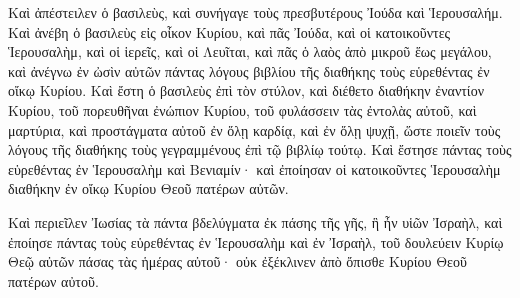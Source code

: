 {\par }{\PP {}Καὶ ἀπέστειλεν ὁ βασιλεὺς, καὶ συνήγαγε τοὺς πρεσβυτέρους Ἰούδα καὶ Ἱερουσαλήμ.
Καὶ ἀνέβη ὁ βασιλεὺς εἰς οἶκον Κυρίου, καὶ πᾶς Ἰούδα, καὶ οἱ κατοικοῦντες Ἱερουσαλὴμ, καὶ οἱ ἱερεῖς, καὶ οἱ Λευῖται, καὶ πᾶς ὁ λαὸς ἀπὸ μικροῦ ἕως μεγάλου, καὶ ἀνέγνω ἐν ὠσὶν αὐτῶν πάντας λόγους βιβλίου τῆς διαθήκης τοὺς εὑρεθέντας ἐν οἴκῳ Κυρίου.
Καὶ ἔστη ὁ βασιλεὺς ἐπὶ τὸν στύλον, καὶ διέθετο διαθήκην ἐναντίον Κυρίου, τοῦ πορευθῆναι ἐνώπιον Κυρίου, τοῦ φυλάσσειν τὰς ἐντολὰς αὐτοῦ, καὶ μαρτύρια, καὶ προστάγματα αὐτοῦ ἐν ὅλῃ καρδίᾳ, καὶ ἐν ὅλῃ ψυχῇ, ὥστε ποιεῖν τοὺς λόγους τῆς διαθήκης τοὺς γεγραμμένους ἐπὶ τῷ βιβλίῳ τούτῳ.
Καὶ ἔστησε πάντας τοὺς εὑρεθέντας ἐν Ἱερουσαλὴμ καὶ Βενιαμίν· καὶ ἐποίησαν οἱ κατοικοῦντες Ἱερουσαλὴμ διαθήκην ἐν οἴκῳ Κυρίου Θεοῦ πατέρων αὐτῶν.
\par }{\PP {}Καὶ περιεῖλεν Ἰωσίας τὰ πάντα βδελύγματα ἐκ πάσης τῆς γῆς, ἣ ἦν υἱῶν Ἰσραὴλ, καὶ ἐποίησε πάντας τοὺς εὑρεθέντας ἐν Ἱερουσαλὴμ καὶ ἐν Ἰσραὴλ, τοῦ δουλεύειν Κυρίῳ Θεῷ αὐτῶν πάσας τὰς ἡμέρας αὐτοῦ· οὐκ ἐξέκλινεν ἀπὸ ὄπισθε Κυρίου Θεοῦ πατέρων αὐτοῦ.

}
